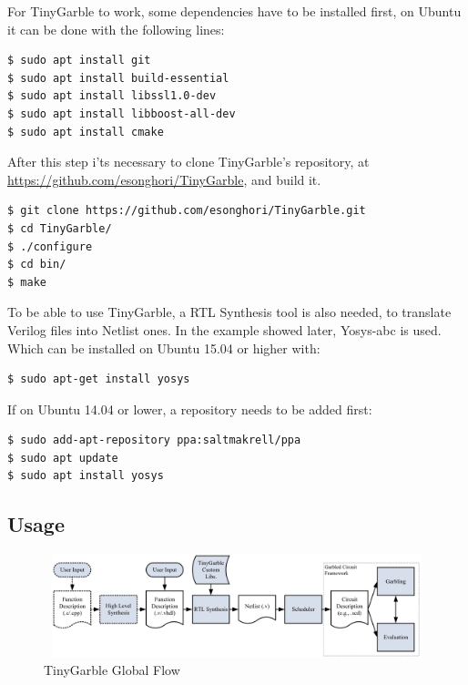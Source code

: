 \begin{refsection}
For TinyGarble to work, some dependencies have to be installed first, on Ubuntu it can be done with the following lines:

\begin{lstlisting}[caption={Installation of TinyGarble's dependencies}, language=bash, captionpos=b]
$ sudo apt install git
$ sudo apt install build-essential
$ sudo apt install libssl1.0-dev
$ sudo apt install libboost-all-dev
$ sudo apt install cmake
\end{lstlisting}

After this step i'ts necessary to clone TinyGarble's repository, at \url{https://github.com/esonghori/TinyGarble}, and build it.

\begin{lstlisting}[caption={Configuration and compilation of TinyGarble}, language=bash, captionpos=b]
$ git clone https://github.com/esonghori/TinyGarble.git
$ cd TinyGarble/
$ ./configure
$ cd bin/
$ make
\end{lstlisting}

To be able to use TinyGarble, a RTL Synthesis tool is also needed, to translate Verilog files into Netlist ones. In the example showed later, Yosys-abc is used. Which can be installed on Ubuntu 15.04 or higher with:

\begin{lstlisting}[caption={Installation of Yosys-abc for Ubuntu 15.04>}, language=bash, captionpos=b]
$ sudo apt-get install yosys
\end{lstlisting}

If on Ubuntu 14.04 or lower, a repository needs to be added first:

\begin{lstlisting}[caption={Installation of Yosys-abc for Ubuntu 14.04<}, language=bash, captionpos=b]
$ sudo add-apt-repository ppa:saltmakrell/ppa
$ sudo apt update
$ sudo apt install yosys
\end{lstlisting}

\newpage

\subsection{Usage}

\begin{figure}[H]
	\centering
	\includegraphics[width=1\textwidth, height=3cm]{./sdf/tiny_garble/figures/tiny_garble_flow.png}
    \caption{TinyGarble Global Flow\cite{Songhori}}\label{fig:tinygarble_flow}
\end{figure}


\end{refsection}
